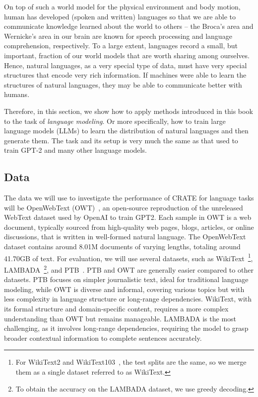 \documentclass[../../book-main.tex]{subfiles}
\begin{document}
On top of such a world model for the physical environment and body
motion, human has developed (spoken and written) languages so that we
are able to communicate knowledge learned about the world to others
-- the Broca's area and Wernicke's area in our brain are known for
speech processing and language comprehension, respectively. To a
large extent, languages record a small, but important, fraction of
our world models that are worth sharing among ourselves. Hence,
natural languages, as a very special type of data, must have very
special structures that encode very rich information. If machines
were able to learn the structures of natural languages, they may be
able to communicate better with humans.

Therefore, in this section, we show how to apply methods introduced
in this book to the task of \textit{language modeling}. Or more
specifically, how to train large language models (LLMs) to learn the
distribution of natural languages and then generate them. The task
and its setup is very much the same as that used to train GPT-2 and
many other language models.

\subsection{Data} \label{sub:clm_text_data}

The data we will use to investigate the performance of CRATE for
language tasks will be OpenWebText (OWT)~\cite{Gokaslan2019OpenWeb},
an open-source reproduction of the unreleased WebText dataset used by
OpenAI to train GPT2. Each sample in OWT is a web document, typically
sourced from high-quality web pages, blogs, articles, or online
discussions, that is written in well-formed natural language. The
OpenWebText dataset contains around 8.01M documents of varying
lengths, totaling around 41.70GB of text. For evaluation, we will use
several datasets, such as
WikiText~\cite{merity2016pointer}\footnote{For WikiText2 and
WikiText103~\cite{merity2016pointer}, the test splits are the same,
so we merge them as a single dataset referred to as WikiText.},
LAMBADA~\cite{paperno2016lambadadatasetwordprediction}\footnote{To
obtain the accuracy on the LAMBADA dataset, we use greedy decoding.},
and PTB~\cite{marcus-etal-1993-building}. PTB and OWT are generally
easier compared to other datasets. PTB focuses on simpler
journalistic text, ideal for traditional language modeling, while OWT
is diverse and informal, covering various topics but with less
complexity in language structure or long-range dependencies.
WikiText, with its formal structure and domain-specific content,
requires a more complex understanding than OWT but remains
manageable. LAMBADA is the most challenging, as it involves
long-range dependencies, requiring the model to grasp broader
contextual information to complete sentences accurately.
\end{document}
